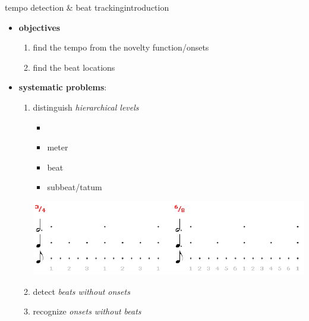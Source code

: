        \begin{frame}{tempo detection \& beat tracking}{introduction}
            \begin{itemize}
                \item \textbf{objectives}
                    \begin{enumerate}
                        \item	find the tempo from the novelty function/onsets
                        \item	find the beat locations
                    \end{enumerate}
                \bigskip
                \item \textbf{systematic problems}:
                    \begin{enumerate}
                        \item	distinguish \textit{hierarchical levels}
                            \begin{itemize}
                                \item[]	
                                \item	meter
                                \item	beat
                                \item	subbeat/tatum
                            \end{itemize}
                            \vspace{-17mm}
                            \begin{flushright}
                                \includegraphics[scale=.25]{graph/periodiclevels}
                            \end{flushright}
                        \item<1->	detect \textit{beats without onsets}
                        \item<1->	recognize \textit{onsets without beats}
                    \end{enumerate}
            \end{itemize}
        \end{frame}

